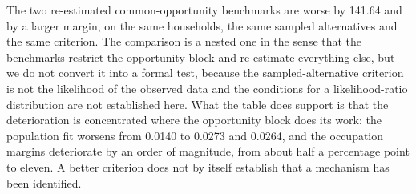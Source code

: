 The two re-estimated common-opportunity benchmarks are worse by 141.64 and by a larger margin, on the same households, the same sampled alternatives and the same criterion. The comparison is a nested one in the sense that the benchmarks restrict the opportunity block and re-estimate everything else, but we do not convert it into a formal test, because the sampled-alternative criterion is not the likelihood of the observed data and the conditions for a likelihood-ratio distribution are not established here. What the table does support is that the deterioration is concentrated where the opportunity block does its work: the population fit worsens from 0.0140 to 0.0273 and 0.0264, and the occupation margins deteriorate by an order of magnitude, from about half a percentage point to eleven. A better criterion does not by itself establish that a mechanism has been identified.

